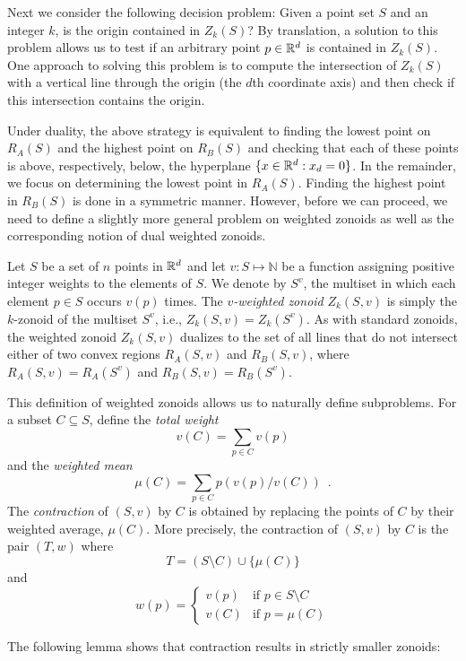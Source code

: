 \documentclass[lotsofwhite]{patmorin}
\begin{document}
Next we consider the following decision problem:  Given a point set
$S$ and an integer $k$, is the origin contained in $Z_k(S)$?  By
translation, a solution to this problem allows us to test if an
arbitrary point $p\in\mathbb{R}^d$ is contained in $Z_k(S)$. One
approach to solving this problem is to compute the intersection of
$Z_k(S)$ with a vertical line through the origin (the $d$th coordinate
axis) and then check if this intersection contains the origin. 

Under duality, the above strategy is equivalent to finding the lowest
point on $R_A(S)$ and the highest point on $R_B(S)$ and checking that each
of these points is above, respectively, below, the hyperplane
$\{x\in\mathbb{R}^d:x_d=0\}$.  In the remainder, we focus on determining the
lowest point in $R_A(S)$.  Finding the highest point in $R_B(S)$ is done in
a symmetric manner.  However, before we can proceed, we need to define
a slightly more general problem on weighted zonoids as well as the
corresponding notion of dual weighted zonoids.

Let $S$ be a set of $n$ points in $\mathbb{R}^d$ and let
$v:S\mapsto\mathbb{N}$ be a function assigning positive integer
weights to the elements of $S$.   We denote by $S^v$, the multiset in
which each element $p\in S$ occurs $v(p)$ times.  The
\emph{$v$-weighted zonoid} $Z_k(S,v)$ is simply the $k$-zonoid of the
multiset $S^v$, i.e., $Z_k(S,v)=Z_k(S^v)$.  As with standard zonoids,
the weighted zonoid $Z_k(S,v)$ dualizes to the set of all lines that
do not intersect either of two convex regions $R_A(S,v)$ and
$R_B(S,v)$, where $R_A(S,v)=R_A(S^v)$ and $R_B(S,v)=R_B(S^v)$.


This definition of weighted zonoids
allows us to naturally define subproblems.
For a subset $C\subseteq S$, define the \emph{total weight}
\[
       v(C)=\sum_{p\in C}v(p)
\]
and the \emph{weighted mean}
\[ 
       \mu(C)=\sum_{p\in C} p(v(p)/v(C)) \enspace .
\]
The \emph{contraction} of
$(S,v)$ by $C$ is obtained by replacing the points of $C$ by their
weighted average, $\mu(C)$.  More precisely, the contraction of
$(S,v)$ by $C$ is the pair $(T,w)$ where 
\[ T = (S\setminus C) \cup \{ \mu(C) \} \] 
and 
\[ w(p) = \left\{\begin{array}{ll} 
        v(p) & \mbox{if $p\in S\setminus C$} \\ 
        v(C) & \mbox{if $p=\mu(C)$} \end{array}\right.
\]

The following lemma shows that contraction results in strictly smaller
zonoids:
\end{document}

